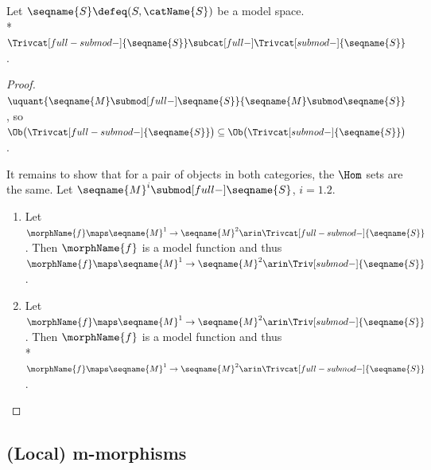 \documentclass{article}
\begin{document}
\begin{lemma}
\label{lem:modtrivcat}

Let $\seqname{S} \defeq (S, \catName{S})$ be a model space. \\*
\nobreaks
  {{
    $
      \Trivcat[full-submod-]{\seqname{S}} \subcat[full-]
      \Trivcat[submod-]{\seqname{S}}
    $.
  }}

\begin{proof}
$
  \uquant
    {\seqname{M} \submod[full-] \seqname{S}}
    {\seqname{M} \submod \seqname{S}}
$,
so
$
  \Ob \bigl (  \Trivcat[full-submod-]{\seqname{S}} \bigr ) \subseteq
  \Ob \bigl ( \Trivcat[submod-]{\seqname{S}} \bigr )
$.

It remains to show that for a pair of objects in both categories, the $\Hom$ sets are the same.
Let $\seqname{M}^i \submod[full-] \seqname{S}$, $i=1.2$.
\begin{enumerate}
\item
Let
$
  \morphName{f} \maps \seqname{M}^1 \to \seqname{M}^2 \arin
  \Trivcat[full-submod-]{\seqname{S}}
$.
Then $\morphName{f}$ is a model function and thus
$
  \morphName{f} \maps \seqname{M}^1 \to \seqname{M}^2 \arin
  \Triv[submod-]{\seqname{S}}
$.
\item
Let
$
  \morphName{f} \maps \seqname{M}^1 \to \seqname{M}^2 \arin
  \Triv[submod-]{\seqname{S}}
$.
Then $\morphName{f}$ is a model function and thus \\*
$
  \morphName{f} \maps \seqname{M}^1 \to \seqname{M}^2 \arin
  \Trivcat[full-submod-]{\seqname{S}}
$.
\end{enumerate}

\end{proof}
\end{lemma}

\subsection{(Local) m-morphisms}
\end{document}
